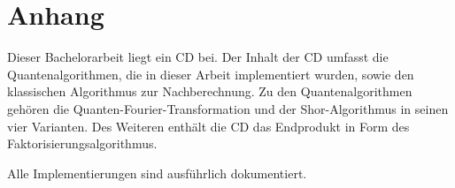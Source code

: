 \newpage
\section{Anhang}
Dieser Bachelorarbeit liegt ein CD bei. 
Der Inhalt der CD umfasst die Quantenalgorithmen, 
die in dieser Arbeit implementiert wurden, sowie den klassischen Algorithmus zur Nachberechnung. 
Zu den Quantenalgorithmen gehören die Quanten-Fourier-Transformation und 
der Shor-Algorithmus in seinen vier Varianten. 
Des Weiteren enthält die CD das Endprodukt in Form des Faktorisierungsalgorithmus. 

Alle Implementierungen sind ausführlich dokumentiert.
